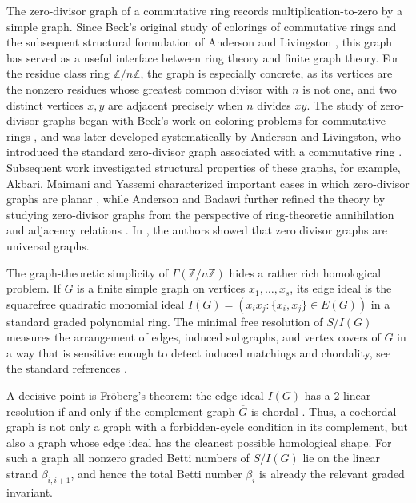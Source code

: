 \documentclass[12pt]{article}
\theoremstyle{definition}
\begin{document}
The zero-divisor graph of a commutative ring records multiplication-to-zero by a simple graph.  Since Beck's original study of colorings of commutative rings \cite{Beck1988} and the subsequent structural formulation of Anderson and Livingston \cite{AndersonLivingston1999}, this graph has served as a useful interface between ring theory and finite graph theory.  For the residue class ring $\mathbb{Z}/n\mathbb{Z}$, the graph is especially concrete, as its vertices are the nonzero residues whose greatest common divisor with $n$ is not one, and two distinct vertices $x,y$ are adjacent precisely when $n$ divides $xy$. The study of zero-divisor graphs began with Beck’s work on coloring problems for commutative rings \cite{Beck1988}, and was later developed systematically by Anderson and Livingston, who introduced the standard zero-divisor graph associated with a commutative ring \cite{AndersonLivingston1999}. Subsequent work investigated structural properties of these graphs, for example, Akbari, Maimani and Yassemi characterized important cases in which zero-divisor graphs are planar \cite{AkbariMaimaniYassemi2003}, while Anderson and Badawi further refined the theory by studying zero-divisor graphs from the perspective of ring-theoretic annihilation and adjacency relations \cite{AndersonBadawi2008}. In \cite{ArunkumaraCameronKavaskarTamizh2023}, the authors showed that zero divisor graphs are universal graphs.


\medskip

The graph-theoretic simplicity of $\Gamma(\mathbb{Z}/n\mathbb{Z})$ hides a rather rich homological problem.  If $G$ is a finite simple graph on vertices $x_1,\ldots,x_s$, its edge ideal is the squarefree quadratic monomial ideal $I(G)=(x_ix_j:\{x_i,x_j\}\in E(G))$ in a standard graded polynomial ring.  The minimal free resolution of $S/I(G)$ measures the arrangement of edges, induced subgraphs, and vertex covers of $G$ in a way that is sensitive enough to detect induced matchings and chordality, see the standard references \cite{HerzogHibi2011,Villarreal2015}.

\medskip

A decisive point is Fröberg's theorem: the edge ideal $I(G)$ has a $2$-linear resolution if and only if the complement graph $\overline{G}$ is chordal \cite{Froberg1990}.  Thus, a cochordal graph is not only a graph with a forbidden-cycle condition in its complement, but also a graph whose edge ideal has the cleanest possible homological shape.  For such a graph all nonzero graded Betti numbers of $S/I(G)$ lie on the linear strand $\beta_{i,i+1}$, and hence the total Betti number $\beta_i$ is already the relevant graded invariant.
\end{document}
